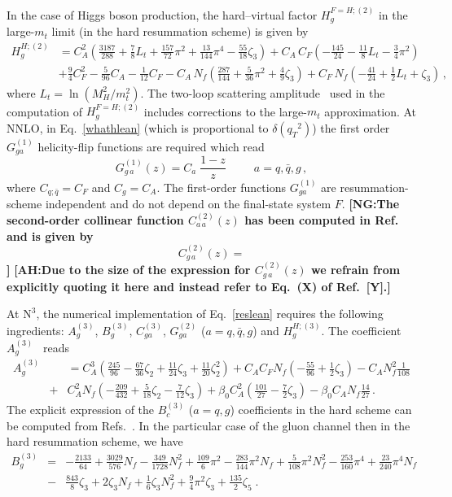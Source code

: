 \documentclass[12pt]{article}
\DeclareRobustCommand{\nn}{\nonumber}
\DeclareRobustCommand{\AH}[1]{\textbf{\quad\color{purple}[AH:\quad #1]}\xspace}
\DeclareRobustCommand{\NG}[1]{\textbf{\quad\color{blue}[NG:\quad #1]}\xspace}
\def\beeq{\begin{eqnarray}}
\def\eeeq{\end{eqnarray}}
\DeclareRobustCommand{\qt}{\ensuremath{q_T}\xspace}
\DeclareRobustCommand{\LO}{\text{LO}\xspace}
\DeclareRobustCommand{\N}[1]{\ensuremath{\text{N}^{#1}}} %
\begin{document}
\begin{appendix}
In the case of Higgs boson production, the hard--virtual factor $H^{F=H;(2)}_{g}$ in the large-$m_t$ limit (in the hard resummation scheme) is given by~\cite{Catani:2011kr}
\begin{align}
\label{H2g}
H_g^{H;(2)}&=C_A^2\left(
\frac{3187}{288}+\frac{7}{8}L_t+\frac{157}{72}\pi^2+\frac{13}{144}\pi^4-\frac{55}{18}\zeta_3\right)+C_A\, C_F\left(-\frac{145}{24}-\frac{11}{8}L_t-\frac{3}{4}\pi^2\right)\nn\\
&+\frac{9}{4}C_F^2
-\frac{5}{96}C_A-\frac{1}{12}C_F-C_A\, N_f\left(\frac{287}{144}+\frac{5}{36}\pi^2+\frac{4}{9}\zeta_3\right)
+C_F\, N_f\left(-\frac{41}{24}+\frac{1}{2}L_t+\zeta_3\right)\, ,
\end{align}
where $L_t=\ln (M_H^2/m_t^2)$. The two-loop scattering amplitude~\cite{Harlander:2009bw}  used in the computation of  $H^{F=H;(2)}_{g}$ includes corrections to the large-$m_t$ approximation.
At NNLO, in Eq.~\eqref{whathlean} (which is proportional to $\delta(\qt^{2})$) the first order $G_{ga}^{(1)}$ helicity-flip functions are required which read~\cite{Catani:2010pd}
\begin{equation}
G_{g \,a}^{(1)}(z) = C_a \;\frac{1-z}{z}~~~~~~~~~~~a=q,\bar{q},g\, ,
\end{equation}
where $C_{q;\bar{q}}=C_{F}$ and $C_g=C_{A}$. The first-order functions $G_{ga}^{(1)}$ are resummation-scheme independent and do not depend on the final-state system $F$.
\NG{The second-order collinear function $C_{a\,a}^{(2)}(z)$ has been computed in Ref.
and is given by
\begin{equation}
C_{g \,a}^{(2)}(z) = 
\end{equation}
}
\AH{Due to the size of the expression for $C_{g \,a}^{(2)}(z)$ we refrain from explicitly quoting it here and instead refer to Eq.~(X) of Ref.~[Y].}

At \N3\LO, the numerical implementation of Eq.~\eqref{reslean} requires the following ingredients: $A^{(3)}_{g}$, $B^{(3)}_{g}$, $C^{(3)}_{ga}$, $G^{(2)}_{ga}$ ($a=q,{\bar q},g$) and $H^{H;(3)}_{g}$. The coefficient $A_g^{(3)}$~\cite{Becher:2010tm} reads
\beeq
\label{acoeff}
A_g^{(3)}\!\!\!&&\!\!\!\!\!\!\!\!  =  C_A^3 \left( \frac{245}{96} - \frac{67}{36}\zeta_2
 + \frac{11}{24}\zeta_3 + \frac{11}{20}\zeta_2^2\right) 
 + C_A C_F N_f \left(-\frac{55}{96} + \frac{1}{2}\zeta_3\right)
 - C_A N_f^2 \frac{1}{108} \nn\\
 &+& \!\!C_A^2 N_f \left(-\frac{209}{432} + \frac{5}{18}\zeta_2 - \frac{7}{12} \zeta_3\right)  
 + \beta_{0} C_A^2\left(\frac{101}{27}-\frac{7}{2}\zeta_{3}\right)- \beta_{0} C_A N_f \frac{14}{27}\,.
\eeeq
The explicit expression of the $B_c^{(3)}$ ($a=q,g$) coefficients in the hard scheme can be computed from Refs.~\cite{Li:2016ctv,Vladimirov:2016dll}. In the particular case of the gluon channel then in the hard resummation scheme, we have
\beeq
B_g^{(3)}&=& - \frac{2133}{64} +  \frac{3029}{576} N_{f} - \frac{349}{1728} N_{f}^{2}  + \frac{109}{6} \pi^{2} - \frac{283}{144} \pi^{2}  N_{f} + \frac{5}{108} \pi^{2}  N_{f}^{2}-\frac{253}{160} \pi^{4}+\frac{23}{240} \pi^{4} N_{f}\nn\\
&-& \frac{843}{8} \zeta_{3} + 2 \zeta_{3} N_{f} + \frac{1}{6} \zeta_{3} N_{f}^{2} + \frac{9}{4} \pi^{2}  \zeta_{3} + \frac{135}{2}  \zeta_{5}\;.
\eeeq


\end{appendix}
\end{document}
